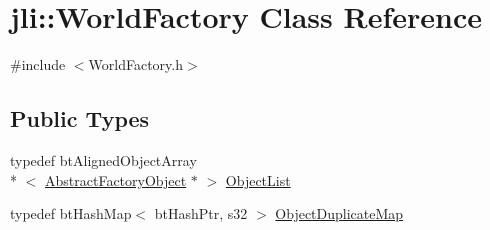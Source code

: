 \hypertarget{classjli_1_1_world_factory}{\section{jli\+:\+:World\+Factory Class Reference}
\label{classjli_1_1_world_factory}
}


{\ttfamily \#include $<$World\+Factory.\+h$>$}

\subsection*{Public Types}
\begin{DoxyCompactItemize}
\item 
typedef bt\+Aligned\+Object\+Array\\*
$<$ \hyperlink{classjli_1_1_abstract_factory_object}{Abstract\+Factory\+Object} $\ast$ $>$ \hyperlink{classjli_1_1_world_factory_ab7d8f835ed36ede3da410326c80709c8}{Object\+List}
\item 
typedef bt\+Hash\+Map$<$ bt\+Hash\+Ptr, s32 $>$ \hyperlink{classjli_1_1_world_factory_ac26bf6a5e096985680e8a45b33f7873c}{Object\+Duplicate\+Map}
\end{DoxyCompactItemize}
